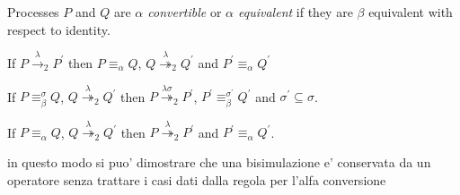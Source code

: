 \begin{definition}
  Processes $P$ and $Q$ are \emph{$\alpha$ convertible} or \emph{$\alpha$ equivalent} if they are $\beta$ equivalent with respect to identity.
\end{definition}

\begin{lemma}
  If $P\xrightarrow{\lambda}_{2} P^{'}$ then $P\equiv_{\alpha} Q$, $Q\stackrel{\lambda}{\twoheadrightarrow}_{2} Q^{'}$ and $P^{'}\equiv_{\alpha} Q^{'}$
\end{lemma}


\begin{lemma}
  If $P\equiv_{\beta}^{\sigma} Q$, $Q\stackrel{\lambda}{\twoheadrightarrow}_{2} Q^{'}$ then $P\stackrel{\lambda\sigma}{\twoheadrightarrow}_{2} P^{'}$, $P^{'}\equiv_{\beta}^{\sigma^{'}} Q^{'}$ and $\sigma^{'}\subseteq \sigma$.
\end{lemma}

\begin{lemma}
  If $P\equiv_{\alpha} Q$, $Q\stackrel{\lambda}{\twoheadrightarrow}_{2} Q^{'}$ then $P\stackrel{\lambda}{\twoheadrightarrow}_{2} P^{'}$ and $P^{'}\equiv_{\alpha} Q^{'}$.
\end{lemma}

in questo modo si puo' dimostrare che una bisimulazione e' conservata da un operatore senza trattare i casi dati dalla regola per l'alfa conversione
